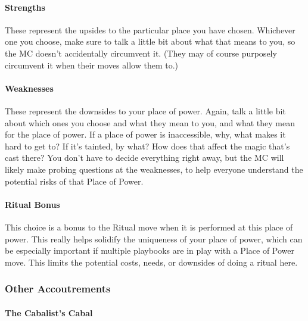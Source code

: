 \documentclass[
]{article}
\begin{document}
\hypertarget{strengths}{%
\paragraph{Strengths}\label{strengths}}

These represent the upsides to the particular place you have chosen.
Whichever one you choose, make sure to talk a little bit about what that
means to you, so the MC doesn't accidentally circumvent it. (They may of
course purposely circumvent it when their moves allow them to.)

\hypertarget{weaknesses}{%
\paragraph{Weaknesses}\label{weaknesses}}

These represent the downsides to your place of power. Again, talk a
little bit about which ones you choose and what they mean to you, and
what they mean for the place of power. If a place of power is
inaccessible, why, what makes it hard to get to? If it's tainted, by
what? How does that affect the magic that's cast there? You don't have
to decide everything right away, but the MC will likely make probing
questions at the weaknesses, to help everyone understand the potential
risks of that Place of Power.

\hypertarget{ritual-bonus}{%
\paragraph{Ritual Bonus}\label{ritual-bonus}}

This choice is a bonus to the Ritual move when it is performed at this
place of power. This really helps solidify the uniqueness of your place
of power, which can be especially important if multiple playbooks are in
play with a Place of Power move. This limits the potential costs, needs,
or downsides of doing a ritual here.

\hypertarget{other-accoutrements}{%
\subsubsection{Other Accoutrements}\label{other-accoutrements}}

\hypertarget{the-cabalists-cabal}{%
\paragraph{The Cabalist's Cabal}\label{the-cabalists-cabal}}
\end{document}
